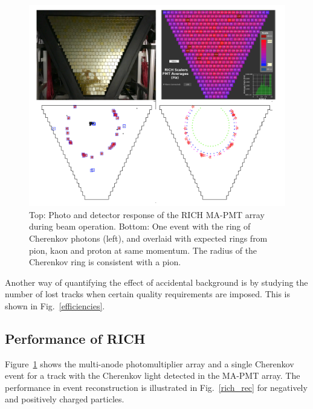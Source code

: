 \documentclass[final,3p,twocolumn]{elsarticle}
\begin{document}
\vfill
\begin{figure}[htbp!]
\centerline{\includegraphics[width=1.0\columnwidth]{rich-event.png}}
\caption{Top: Photo and detector response of the RICH MA-PMT array during beam operation. 
Bottom: One event with the ring of Cherenkov photons (left), and overlaid with expected rings from 
pion, kaon and proton at same momentum. The radius of the Cherenkov ring  is consistent with a pion.  }
\label{rich-event}
\end{figure}

\noindent Another way of quantifying the effect of accidental background is by studying the number of lost tracks when certain quality requirements are imposed. This is shown in Fig.~\ref{efficiencies}.  

\subsection{Performance of RICH} 

Figure~\ref{rich-event} shows the multi-anode photomultiplier array and a single Cherenkov event for a track with the
Cherenkov light detected in the MA-PMT array.  The performance in event reconstruction is illustrated in
Fig.~\ref{rich_rec} for negatively and positively charged particles. 
\end{document}
